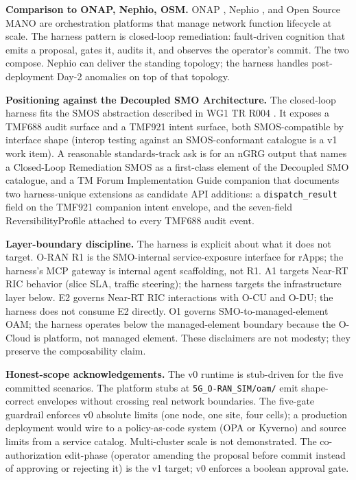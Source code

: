 \documentclass[twocolumn,10pt,a4paper]{article}
\begin{document}
\textbf{Comparison to ONAP, Nephio, OSM.} ONAP \cite{onap}, Nephio \cite{nephio}, and Open Source MANO \cite{osm} are orchestration platforms that manage network function lifecycle at scale. The harness pattern is closed-loop remediation: fault-driven cognition that emits a proposal, gates it, audits it, and observes the operator's commit. The two compose. Nephio can deliver the standing topology; the harness handles post-deployment Day-2 anomalies on top of that topology.

\textbf{Positioning against the Decoupled SMO Architecture.} The closed-loop harness fits the SMOS abstraction described in WG1 TR R004 \cite{oran_decoupled_smo}. It exposes a TMF688 audit surface and a TMF921 intent surface, both SMOS-compatible by interface shape (interop testing against an SMOS-conformant catalogue is a v1 work item). A reasonable standards-track ask is for an nGRG output that names a Closed-Loop Remediation SMOS as a first-class element of the Decoupled SMO catalogue, and a TM Forum Implementation Guide companion that documents two harness-unique extensions as candidate API additions: a \texttt{dispatch\_result} field on the TMF921 companion intent envelope, and the seven-field ReversibilityProfile attached to every TMF688 audit event.

\textbf{Layer-boundary discipline.} The harness is explicit about what it does not target. O-RAN R1 \cite{oran_r1} is the SMO-internal service-exposure interface for rApps; the harness's MCP gateway is internal agent scaffolding, not R1. A1 \cite{oran_a1} targets Near-RT RIC behavior (slice SLA, traffic steering); the harness targets the infrastructure layer below. E2 \cite{oran_e2} governs Near-RT RIC interactions with O-CU and O-DU; the harness does not consume E2 directly. O1 \cite{oran_o1} governs SMO-to-managed-element OAM; the harness operates below the managed-element boundary because the O-Cloud is platform, not managed element. These disclaimers are not modesty; they preserve the composability claim.

\textbf{Honest-scope acknowledgements.} The v0 runtime is stub-driven for the five committed scenarios. The platform stubs at \texttt{5G\_O-RAN\_SIM/oam/} emit shape-correct envelopes without crossing real network boundaries. The five-gate guardrail enforces v0 absolute limits (one node, one site, four cells); a production deployment would wire to a policy-as-code system (OPA or Kyverno) and source limits from a service catalog. Multi-cluster scale is not demonstrated. The co-authorization edit-phase (operator amending the proposal before commit instead of approving or rejecting it) is the v1 target; v0 enforces a boolean approval gate.
\end{document}
